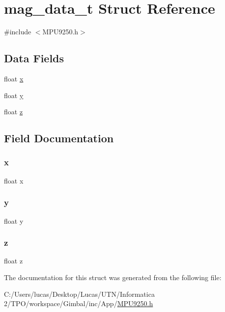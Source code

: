 \hypertarget{structmag__data__t}{}\section{mag\+\_\+data\+\_\+t Struct Reference}
\label{structmag__data__t}


{\ttfamily \#include $<$M\+P\+U9250.\+h$>$}

\subsection*{Data Fields}
\begin{DoxyCompactItemize}
\item 
float \mbox{\hyperlink{structmag__data__t_ad0da36b2558901e21e7a30f6c227a45e}{x}}
\item 
float \mbox{\hyperlink{structmag__data__t_aa4f0d3eebc3c443f9be81bf48561a217}{y}}
\item 
float \mbox{\hyperlink{structmag__data__t_af73583b1e980b0aa03f9884812e9fd4d}{z}}
\end{DoxyCompactItemize}


\subsection{Field Documentation}
\mbox{\label{structmag__data__t_ad0da36b2558901e21e7a30f6c227a45e}} 
\subsubsection{\texorpdfstring{x}{x}}
{\footnotesize\ttfamily float x}

\mbox{\label{structmag__data__t_aa4f0d3eebc3c443f9be81bf48561a217}} 
\subsubsection{\texorpdfstring{y}{y}}
{\footnotesize\ttfamily float y}

\mbox{\label{structmag__data__t_af73583b1e980b0aa03f9884812e9fd4d}} 
\subsubsection{\texorpdfstring{z}{z}}
{\footnotesize\ttfamily float z}



The documentation for this struct was generated from the following file\+:\begin{DoxyCompactItemize}
\item 
C\+:/\+Users/lucas/\+Desktop/\+Lucas/\+U\+T\+N/\+Informatica 2/\+T\+P\+O/workspace/\+Gimbal/inc/\+App/\mbox{\hyperlink{_m_p_u9250_8h}{M\+P\+U9250.\+h}}\end{DoxyCompactItemize}
